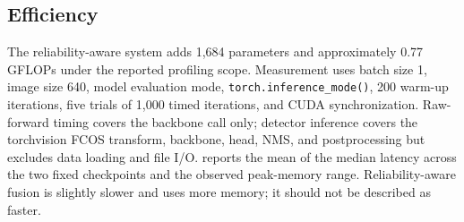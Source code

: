 \subsection{Efficiency}
The reliability-aware system adds 1,684 parameters and approximately 0.77 GFLOPs under the reported profiling scope. Measurement uses batch size 1, image size 640, model evaluation mode, \texttt{torch.inference\_mode()}, 200 warm-up iterations, five trials of 1,000 timed iterations, and CUDA synchronization. Raw-forward timing covers the backbone call only; detector inference covers the torchvision FCOS transform, backbone, head, NMS, and postprocessing but excludes data loading and file I/O.  reports the mean of the median latency across the two fixed checkpoints and the observed peak-memory range. Reliability-aware fusion is slightly slower and uses more memory; it should not be described as faster.

